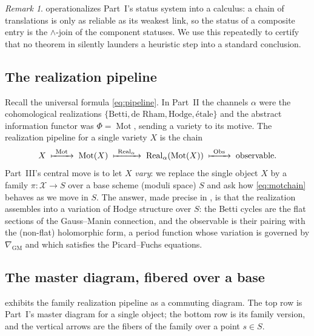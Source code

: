 \documentclass[12pt]{article}
\theoremstyle{definition}
\theoremstyle{remark}
\newtheorem{remark}[theorem]{Remark}
\newcommand{\Mot}{\operatorname{Mot}}
\newcommand{\Real}{\operatorname{Real}}
\newcommand{\Obs}{\operatorname{Obs}}
\newcommand{\GM}{\nabla_{\mathrm{GM}}}
\begin{document}
\begin{remark}
 operationalizes Part~I's status system into a calculus: a chain of translations
is only as reliable as its weakest link, so the status of a composite entry is the $\wedge$-join of the
component statuses. We use this repeatedly to certify that no theorem in  silently
launders a heuristic step into a standard conclusion.
\end{remark}

\subsection{The realization pipeline}

Recall the universal formula \eqref{eq:pipeline}. In Part~II the channels $\alpha$ were the
cohomological realizations $\{\text{Betti},\text{de Rham},\text{Hodge},\text{\'etale}\}$ and the abstract
information functor was $\Phi = \Mot$, sending a variety to its motive. The realization pipeline for a
single variety $X$ is the chain
\begin{equation}\label{eq:motchain}
  X \;\xmapsto{\ \Mot\ }\; \Mot(X) \;\xmapsto{\ \Real_\alpha\ }\; \Real_\alpha(\Mot(X)) \;\xmapsto{\ \Obs\ }\; \text{observable}.
\end{equation}
Part~III's central move is to let $X$ \emph{vary}: we replace the single object $X$ by a family
$\pi\colon \mathcal X\to S$ over a base scheme (moduli space) $S$ and ask how \eqref{eq:motchain}
behaves as we move in $S$. The answer, made precise in , is that the realization assembles
into a variation of Hodge structure over $S$: the Betti cycles are the flat sections of the Gauss--Manin
connection, and the observable is their pairing with the (non-flat) holomorphic form, a period
function whose variation is governed by $\GM$ and which satisfies the Picard--Fuchs equations.

\subsection{The master diagram, fibered over a base}

 exhibits the family realization pipeline as a commuting diagram. The top row is
Part~I's master diagram for a single object; the bottom row is its family version, and the vertical
arrows are the fibers of the family over a point $s\in S$.
\end{document}
